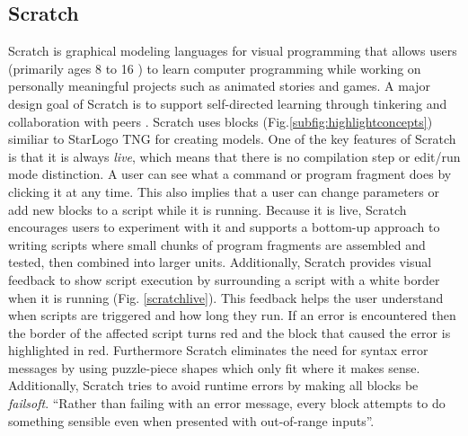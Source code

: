\documentclass[runningheads,a4paper]{llncs}
\begin{document}

   \subsection{Scratch}
  Scratch is graphical modeling languages for visual programming that allows users (primarily ages 8 to 16 \cite{maloney2010scratch}) to learn
  computer programming while working on personally meaningful projects such as animated stories and games. 
  A major design goal of Scratch is to support self-directed learning through tinkering and collaboration with peers \cite{maloney2010scratch}. 
  Scratch uses blocks (Fig.\ref{subfig:highlightconcepts}) similiar to StarLogo TNG for creating models. One of the key features of Scratch is that it is always \emph{live},
  which means that there is no compilation step or edit/run mode distinction. A user can see what a command or program fragment does by clicking 
  it at any time. This also implies that a user can change parameters or add new blocks to a script while it is running.
  Because it is live, Scratch encourages users to experiment with it and supports
  a bottom-up approach to writing scripts where small chunks of program fragments are assembled and tested, then combined into larger units.
  Additionally, Scratch provides visual feedback to show script execution by surrounding a script with a white border when it is 
  running (Fig. \ref{scratchlive}). This feedback
  helps the user understand when scripts are triggered and how long they run. If an error is encountered then the border of the 
  affected script turns red and the block that caused the error is highlighted in red. 
  Furthermore Scratch eliminates the need for syntax error messages by using 
  puzzle-piece shapes which only fit where it makes sense. Additionally, Scratch tries to avoid runtime errors by making all blocks be
  \textit{failsoft}. ``Rather than failing with an error message, every block attempts to do something sensible even when presented with out-of-range inputs''\cite{maloney2010scratch}.
\end{document}
